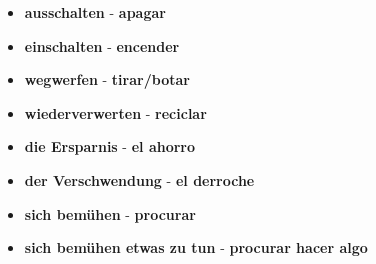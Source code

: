 \documentclass{article}
\begin{document}
\begin{multicols}{2}
\begin{itemize}
\begin{itemize}
			\item{\textbf{ausschalten} - \textbf{apagar}}
			\item{\textbf{einschalten} - \textbf{encender}}
			\item{\textbf{wegwerfen} - \textbf{tirar/botar}}
			\item{\textbf{wiederverwerten} - \textbf{reciclar}}
			\item{\textbf{die Ersparnis} - \textbf{el ahorro}}
			\item{\textbf{der Verschwendung} - \textbf{el derroche}}
			\item{\textbf{sich bemühen} - \textbf{procurar}}
			\item{\textbf{sich bemühen etwas zu tun} - \textbf{procurar hacer algo}}
		\end{itemize}
	\end{itemize}
	\end{multicols}
\end{document}
